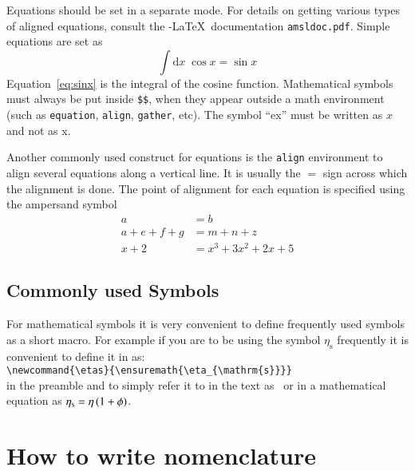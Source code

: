 Equations should be set in a separate mode.  For details on getting
various types of aligned equations, consult the \AmS-\LaTeX\
documentation \verb|amsldoc.pdf|. Simple equations are set as
\begin{equation}
\label{eq:sinx}
\int \mathrm{d}x \; \cos x =  \sin x
\end{equation}
Equation~\eqref{eq:sinx} is the integral of the cosine
function. Mathematical symbols must always be put inside \verb|$$|,
when they appear outside a math environment (such as \verb|equation|,
\verb|align|, \verb|gather|, etc).  The symbol ``ex'' must be written as
$x$ and not as x.

Another commonly used construct for equations is the \verb|align|
environment to align several equations along a vertical line. It is
usually the $=$ sign across which the alignment is done.  The
point of alignment for each equation is specified using the ampersand symbol
\begin{align}
a &= b  \\
a + e + f + g & = m + n + z \\
x + 2 & = x^{3} + 3 x^{2} + 2 x + 5
\end{align}

\subsection{Commonly used Symbols}
For mathematical symbols it is very convenient to define frequently
used symbols as a short macro. For example if you are to be using the
symbol $\eta_{\mathrm{s}}$ frequently it is convenient to define it in
as:\\
\verb|\newcommand{\etas}{\ensuremath{\eta_{\mathrm{s}}}}| \\
in the preamble and to simply refer it to in the text as \etas\ or in
a mathematical equation as $\etas = \eta \, ( 1 + \phi)$.
%

\section{How to write nomenclature}

